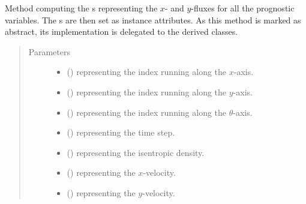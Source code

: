 \documentclass[letterpaper,10pt,english]{sphinxmanual}
\begin{document}
\begin{fulllineitems}
\begin{fulllineitems}
\label{\detokenize{api:tasmania.dycore.flux_isentropic_nonconservative.FluxIsentropicNonconservative._compute_horizontal_fluxes}}
Method computing the s representing the \(x\)- and \(y\)-fluxes for
all the prognostic variables. The s are then set as instance attributes.
As this method is marked as abstract, its implementation is delegated to the derived classes.
\begin{quote}\begin{description}
\item[{Parameters}] \leavevmode\begin{itemize}
\item {} 
 () \textendash{}  representing the index running along the \(x\)-axis.

\item {} 
 () \textendash{}  representing the index running along the \(y\)-axis.

\item {} 
 () \textendash{}  representing the index running along the \(\theta\)-axis.

\item {} 
 () \textendash{}  representing the time step.

\item {} 
 () \textendash{}  representing the isentropic density.

\item {} 
 () \textendash{}  representing the \(x\)-velocity.

\item {} 
 () \textendash{}  representing the \(y\)-velocity.


\end{itemize}
\end{description}
\end{quote}
\end{fulllineitems}
\end{fulllineitems}
\end{document}

